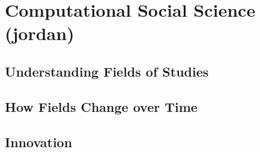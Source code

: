 

\chapter{Computational Social Science (jordan)}
\label{ch:sci}

\section{Understanding Fields of Studies}

\section{How Fields Change over Time}

\section{Innovation}